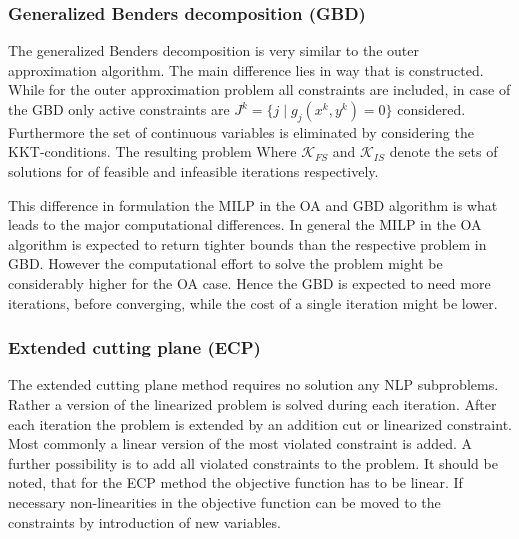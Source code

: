         \subsubsection{Generalized Benders decomposition (GBD)}
        The generalized Benders decomposition is very similar to the outer approximation algorithm. The main difference
        lies in way that  is constructed. While for the outer approximation problem all constraints
        are included, in case of the GBD only active constraints are $J^k = \{j \; | \; g_j(x^k,y^k) = 0\}$ considered.
        Furthermore the set of continuous variables is eliminated by considering the KKT-conditions. The resulting problem
        Where $\mathcal{K}_{FS}$ and $\mathcal{K}_{IS}$ denote the sets of solutions for of feasible and infeasible
        iterations respectively.

        This difference in formulation the MILP in the OA and GBD algorithm is what leads to the major computational differences.
        In general the MILP in the OA algorithm is expected to return tighter bounds than the respective
        problem in GBD. However the computational effort to solve the problem might be considerably higher for the
        OA case. Hence the GBD is expected to need more iterations, before converging, while the cost of a single
        iteration might be lower.

        \subsubsection{Extended cutting plane (ECP)}
        The extended cutting plane method requires no solution any NLP subproblems. Rather a version of the linearized
        problem is solved during each iteration. After each iteration the problem is extended by an addition cut or
        linearized constraint. Most commonly a linear version of the most violated constraint is added. A further
        possibility is to add all violated constraints to the problem. It should be noted, that for the ECP method
        the objective function has to be linear. If necessary non-linearities in the objective function can be moved to the
        constraints by introduction of new variables.

